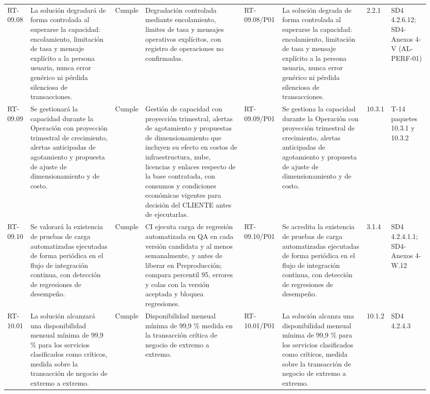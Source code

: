 \documentclass[oficio,firma,final]{lafrox}
\begin{document}
\begin{landscape}
{\begin{longtable}{@{}F{0.054} F{0.173} F{0.061} F{0.191} F{0.106} F{0.180} F{0.067} F{0.168}@{}}
  RT-09.08 & La solución degradará de forma controlada al superarse la capacidad: encolamiento, limitación de tasa y mensaje explícito a la persona usuaria, nunca error genérico ni pérdida silenciosa de transacciones. & Cumple & Degradación controlada mediante encolamiento, límites de tasa y mensajes operativos explícitos, con registro de operaciones no confirmadas. & RT-09.08/\allowbreak{}P01 & La solución degrada de forma controlada al superarse la capacidad: encolamiento, limitación de tasa y mensaje explícito a la persona usuaria, nunca error genérico ni pérdida silenciosa de transacciones. & 2.2.1 & SD4 4.2.6.12; SD4-Anexos 4-V (AL-PERF-01)  \\
  RT-09.09 & Se gestionará la capacidad durante la Operación con proyección trimestral de crecimiento, alertas anticipadas de agotamiento y propuesta de ajuste de dimensionamiento y de costo. & Cumple & Gestión de capacidad con proyección trimestral, alertas de agotamiento y propuestas de dimensionamiento que incluyen su efecto en costos de infraestructura, nube, licencias y enlaces respecto de la base contratada, con consumos y condiciones económicas vigentes para decisión del CLIENTE antes de ejecutarlas. & RT-09.09/\allowbreak{}P01 & Se gestiona la capacidad durante la Operación con proyección trimestral de crecimiento, alertas anticipadas de agotamiento y propuesta de ajuste de dimensionamiento y de costo. & 10.3.1 & T-14 paquetes 10.3.1 y 10.3.2  \\
  RT-09.10 & Se valorará la existencia de pruebas de carga automatizadas ejecutadas de forma periódica en el flujo de integración continua, con detección de regresiones de desempeño. & Cumple & CI ejecuta carga de regresión automatizada en QA en cada versión candidata y al menos semanalmente, y antes de liberar en Preproducción; compara percentil 95, errores y colas con la versión aceptada y bloquea regresiones. & RT-09.10/\allowbreak{}P01 & Se acredita la existencia de pruebas de carga automatizadas ejecutadas de forma periódica en el flujo de integración continua, con detección de regresiones de desempeño. & 3.1.4 & SD4 4.2.4.1.1; SD4-Anexos 4-W.12  \\
  RT-10.01 & La solución alcanzará una disponibilidad mensual mínima de 99,9 \% para los servicios clasificados como críticos, medida sobre la transacción de negocio de extremo a extremo. & Cumple & Disponibilidad mensual mínima de 99,9 \% medida en la transacción crítica de negocio de extremo a extremo. & RT-10.01/\allowbreak{}P01 & La solución alcanza una disponibilidad mensual mínima de 99,9 \% para los servicios clasificados como críticos, medida sobre la transacción de negocio de extremo a extremo. & 10.1.2 & SD4 4.2.4.3  \\

\end{longtable}}
\end{landscape}
\end{document}
